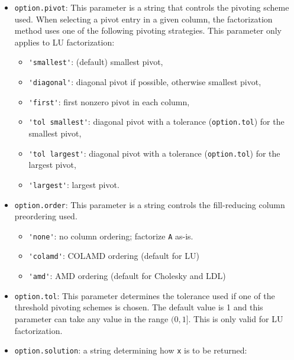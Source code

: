 \documentclass[12pt,oneside]{book}
\theoremstyle{definition}
\begin{document}
\begin{itemize}
\item \verb|option.pivot|: This parameter is a string that controls the
pivoting scheme used.  When selecting a pivot entry in a given column, the
factorization method uses one of the following pivoting strategies. This parameter only applies to LU factorization:

    \begin{itemize}
    \item \verb|'smallest'|: (default) smallest pivot,
    \item \verb|'diagonal'|: diagonal pivot if possible, otherwise smallest pivot,
    \item \verb|'first'|: first nonzero pivot in each column,
    \item \verb|'tol smallest'|: diagonal pivot with a tolerance (\verb|option.tol|)
        for the smallest pivot,
    \item \verb|'tol largest'|: diagonal pivot with a tolerance (\verb|option.tol|)
        for the largest pivot,
    \item \verb|'largest'|: largest pivot.
    \end{itemize}
    
\item \verb|option.order|: This parameter is a string controls the
fill-reducing column preordering used.

    \begin{itemize}
    \item \verb|'none'|: no column ordering; factorize \verb'A' as-is.
    \item \verb|'colamd'|: COLAMD ordering (default for LU)
    \item \verb|'amd'|: AMD ordering (default for Cholesky and LDL)
    \end{itemize}

\item \verb|option.tol|: This parameter determines the tolerance used if one of
the threshold pivoting schemes is chosen. The default value is 1 and this
parameter can take any value in the range $(0,1]$. This is only valid
for LU factorization.

\item \verb|option.solution|:
    a string determining how \verb|x| is to be returned:


\end{itemize}
\end{document}

